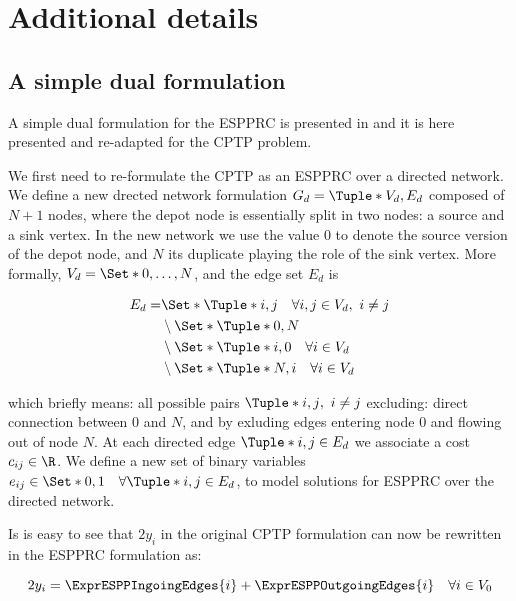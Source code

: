\chapter{Additional details}

\section{A simple dual formulation}\label{sec:cptp-simple-dual-formulation}

A simple dual formulation for the ESPPRC is presented in \cite{beasley1989} and it is here presented and re-adapted for the CPTP problem.

We first need to re-formulate the CPTP as an ESPPRC over a directed network.
We define a new drected network formulation $G_d = \Tuple*{V_d, E_d}$ composed of $N + 1$ nodes, where the depot node is essentially split in two nodes: a source and a sink vertex.
In the new network we use the value $0$ to denote the source version of the depot node, and $N$ its duplicate playing the role of the sink vertex.
More formally, $V_d = \Set*{ 0,\dots, N }$, and the edge set $E_d$ is

\begin{equation}
	\begin{aligned}
		E_d = & \Set*{\Tuple*{i, j} \quad \forall i, j \in V_d,\ i \ne j } \\
		      & \setminus \Set*{ \Tuple*{0, N} }                           \\
		      & \setminus \Set*{ \Tuple*{i, 0} \quad \forall i \in V_d }   \\
		      & \setminus \Set*{ \Tuple*{N, i} \quad \forall i \in V_d }   \\
	\end{aligned}
\end{equation}

which briefly means: all possible pairs $\Tuple*{i, j},\ i \ne j$ excluding: direct connection between $0$ and $N$, and by exluding edges entering node $0$ and flowing out of node $N$.
At each directed edge $\Tuple*{i, j} \in E_d$ we associate a cost $c_{ij} \in \R$.
We define a new set of binary variables $e_{ij} \in \Set*{0, 1} \quad \forall \Tuple*{i, j} \in E_d$, to model solutions for ESPPRC over the directed network.

Is is easy to see that $2 y_i$ in the original CPTP formulation can now be rewritten in the ESPPRC formulation as:

\begin{equation}
	2 y_i = \ExprESPPIngoingEdges{i} + \ExprESPPOutgoingEdges{i} \quad \forall i \in V_0
\end{equation}

